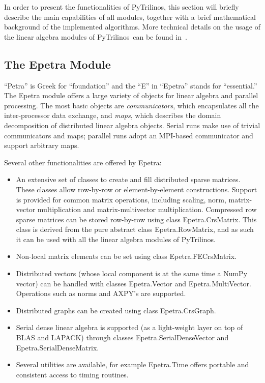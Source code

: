 \documentclass[acmtocl]{acmtrans2m}
\newcommand{\PyTrilinos}{{PyTrilinos}}
\begin{document}
In order to present the functionalities of \PyTrilinos, this section
will briefly describe the main capabilities of all modules, together
with a brief mathematical background of the implemented algorithms.
More technical details on the usage of the linear algebra modules of
\PyTrilinos\ can be found in~\cite{pytrilinos-la-guide}.

\subsection{The Epetra Module}
\label{subsec:epetra}

``Petra'' is Greek for ``foundation'' and the ``E'' in ``Epetra''
stands for ``essential.''  The Epetra module offers a large variety of
objects for linear algebra and parallel processing.  The most basic
objects are {\sl communicators}, which encapsulates all the
inter-processor data exchange, and {\sl maps}, which describes the
domain decomposition of distributed linear algebra objects.  Serial
runs make use of trivial communicators and maps; parallel runs adopt
an MPI-based communicator and support arbitrary maps.

Several other functionalities are offered by Epetra:
\begin{itemize}

\item An extensive set of classes to create and fill distributed
  sparse matrices.  These classes allow row-by-row or
  element-by-element constructions.  Support is provided for common
  matrix operations, including scaling, norm, matrix-vector
  multiplication and matrix-multivector multiplication.  Compressed
  row sparse matrices can be stored row-by-row using class
  Epetra.CrsMatrix.  This class is derived from the pure abstract
  class Epetra.RowMatrix, and as such it can be used with all the
  linear algebra modules of \PyTrilinos.

\item Non-local matrix elements can be set using class
  Epetra.FECrsMatrix.

\item Distributed vectors (whose local component is at the same time a
  NumPy vector) can be handled with classes Epetra.Vector and
  Epetra.MultiVector.  Operations such as norms and AXPY's are
  supported.

\item Distributed graphs can be created using class Epetra.CrsGraph.

\item Serial dense linear algebra is supported (as a light-weight
  layer on top of BLAS and LAPACK) through classes
  Epetra.SerialDenseVector and Epetra.SerialDenseMatrix.

\item Several utilities are available, for example Epetra.Time offers
  portable and consistent access to timing routines.

\end{itemize}
\end{document}
